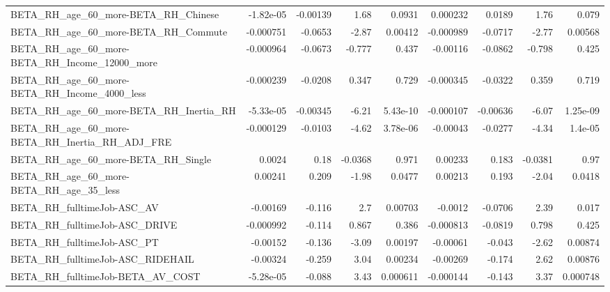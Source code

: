 \begin{tabular}{lrrrrrrrr}
BETA\_RH\_age\_60\_more-BETA\_RH\_Chinese                &   -1.82e-05 &     -0.00139 &     1.68 &   0.0931 &   0.000232 &      0.0189 &         1.76 &         0.079 \\
BETA\_RH\_age\_60\_more-BETA\_RH\_Commute                &   -0.000751 &      -0.0653 &    -2.87 &  0.00412 &  -0.000989 &     -0.0717 &        -2.77 &       0.00568 \\
BETA\_RH\_age\_60\_more-BETA\_RH\_Income\_12000\_more      &   -0.000964 &      -0.0673 &   -0.777 &    0.437 &   -0.00116 &     -0.0862 &       -0.798 &         0.425 \\
BETA\_RH\_age\_60\_more-BETA\_RH\_Income\_4000\_less       &   -0.000239 &      -0.0208 &    0.347 &    0.729 &  -0.000345 &     -0.0322 &        0.359 &         0.719 \\
BETA\_RH\_age\_60\_more-BETA\_RH\_Inertia\_RH             &   -5.33e-05 &     -0.00345 &    -6.21 & 5.43e-10 &  -0.000107 &    -0.00636 &        -6.07 &      1.25e-09 \\
BETA\_RH\_age\_60\_more-BETA\_RH\_Inertia\_RH\_ADJ\_FRE     &   -0.000129 &      -0.0103 &    -4.62 & 3.78e-06 &   -0.00043 &     -0.0277 &        -4.34 &       1.4e-05 \\
BETA\_RH\_age\_60\_more-BETA\_RH\_Single                 &      0.0024 &         0.18 &  -0.0368 &    0.971 &    0.00233 &       0.183 &      -0.0381 &          0.97 \\
BETA\_RH\_age\_60\_more-BETA\_RH\_age\_35\_less            &     0.00241 &        0.209 &    -1.98 &   0.0477 &    0.00213 &       0.193 &        -2.04 &        0.0418 \\
BETA\_RH\_fulltimeJob-ASC\_AV                         &    -0.00169 &       -0.116 &      2.7 &  0.00703 &    -0.0012 &     -0.0706 &         2.39 &         0.017 \\
BETA\_RH\_fulltimeJob-ASC\_DRIVE                      &   -0.000992 &       -0.114 &    0.867 &    0.386 &  -0.000813 &     -0.0819 &        0.798 &         0.425 \\
BETA\_RH\_fulltimeJob-ASC\_PT                         &    -0.00152 &       -0.136 &    -3.09 &  0.00197 &   -0.00061 &      -0.043 &        -2.62 &       0.00874 \\
BETA\_RH\_fulltimeJob-ASC\_RIDEHAIL                   &    -0.00324 &       -0.259 &     3.04 &  0.00234 &   -0.00269 &      -0.174 &         2.62 &       0.00876 \\
BETA\_RH\_fulltimeJob-BETA\_AV\_COST                   &   -5.28e-05 &       -0.088 &     3.43 & 0.000611 &  -0.000144 &      -0.143 &         3.37 &      0.000748 \\

\end{tabular}
